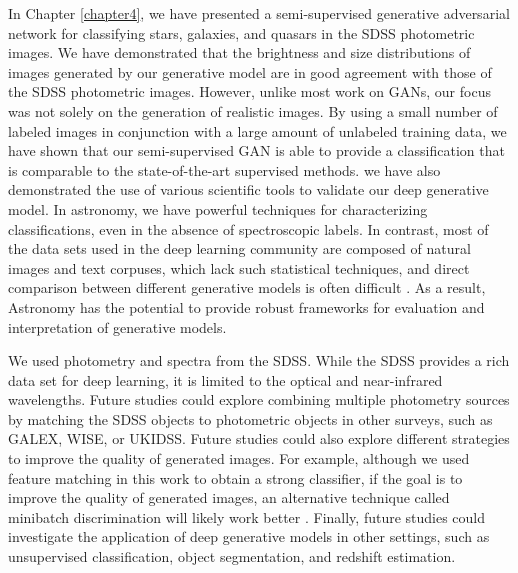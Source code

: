 In Chapter \ref{chapter4}, we have presented a semi-supervised generative adversarial network for classifying stars, galaxies, and quasars in the SDSS photometric images.
We have demonstrated that the brightness and size distributions of images generated by our generative model
are in good agreement with those of the SDSS photometric images.
However, unlike most work on GANs, our focus was not solely on the generation of realistic images.
By using a small number of labeled images in conjunction with a large amount of unlabeled training data,
we have shown that our semi-supervised GAN is able to provide a classification that is comparable to the state-of-the-art
supervised methods.
we have also demonstrated the use of various scientific tools to validate our deep generative model.
In astronomy, we have powerful techniques for characterizing classifications, even in the absence of spectroscopic labels.
In contrast, most of the data sets used in the deep learning community are composed of natural images and text corpuses,
which lack such statistical techniques,
and direct comparison between different generative models is often difficult 
\citep{theis2016note}.
As a result, Astronomy has the potential to provide robust frameworks for evaluation and interpretation of generative models.

We used photometry and spectra from the SDSS.
While the SDSS provides a rich data set for deep learning,
it is limited to the optical and near-infrared wavelengths.
Future studies could explore combining multiple photometry sources by matching the SDSS objects to
photometric objects in other surveys, such as GALEX, WISE, or UKIDSS.
Future studies could also explore different strategies to improve the quality of generated images.
For example, although we used feature matching in this work to obtain a strong classifier,
if the goal is to improve the quality of generated images, an alternative technique
called minibatch discrimination will likely work better \citep{salimans2016improved,dai2017good}.
Finally, future studies could investigate the application of deep generative models in other settings,
such as unsupervised classification, object segmentation, and redshift estimation.

\clearpage

